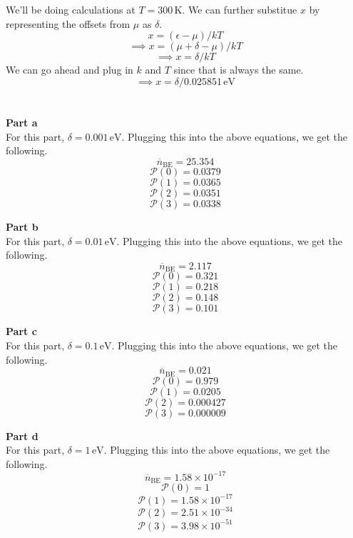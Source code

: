 \documentclass[12pt]{article}
\begin{document}
\begin{flushleft}
We'll be doing calculations at $T=300\,\text{K}$.
We can further substitue $x$ by representing the offsets from $\mu$ as $\delta$.
$$x=(\epsilon-\mu)/kT$$
$$\implies x=(\mu+\delta-\mu)/kT$$
$$\implies x=\delta/kT$$
We can go ahead and plug in $k$ and $T$ since that is always the same.
$$\implies x=\delta/0.025851\,\text{eV}$$\\~\\


\textbf{Part a}\\
For this part, $\delta=0.001\,\text{eV}$.
Plugging this into the above equations, we get the following.
$$\overline{n}_\text{BE}=25.354$$
$$\mathcal{P}(0)=0.0379$$
$$\mathcal{P}(1)=0.0365$$
$$\mathcal{P}(2)=0.0351$$
$$\mathcal{P}(3)=0.0338$$

\textbf{Part b}\\
For this part, $\delta=0.01\,\text{eV}$.
Plugging this into the above equations, we get the following.
$$\overline{n}_\text{BE}=2.117$$
$$\mathcal{P}(0)=0.321$$
$$\mathcal{P}(1)=0.218$$
$$\mathcal{P}(2)=0.148$$
$$\mathcal{P}(3)=0.101$$

\textbf{Part c}\\
For this part, $\delta=0.1\,\text{eV}$.
Plugging this into the above equations, we get the following.
$$\overline{n}_\text{BE}=0.021$$
$$\mathcal{P}(0)=0.979$$
$$\mathcal{P}(1)=0.0205$$
$$\mathcal{P}(2)=0.000427$$
$$\mathcal{P}(3)=0.000009$$

\textbf{Part d}\\
For this part, $\delta=1\,\text{eV}$.
Plugging this into the above equations, we get the following.
$$\overline{n}_\text{BE}=1.58\times10^{-17}$$
$$\mathcal{P}(0)=1$$
$$\mathcal{P}(1)=1.58\times10^{-17}$$
$$\mathcal{P}(2)=2.51\times10^{-34}$$
$$\mathcal{P}(3)=3.98\times10^{-51}$$





\end{flushleft}
\end{document}
